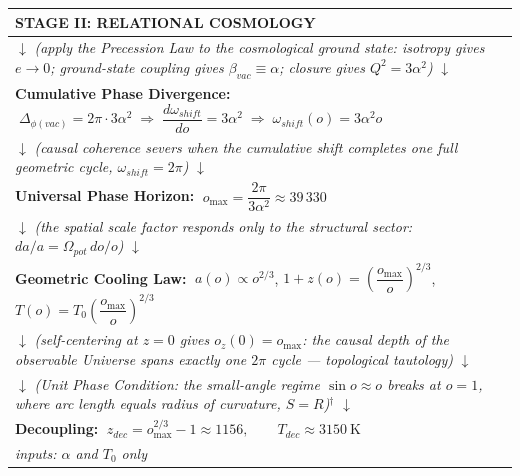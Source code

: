 \begin{tcolorbox}[colback=gray!5, colframe=black!80!black,
                  title=Derivation Chain Map --- WILL RG II (B): Stage II and Closure]
\begin{center}
\renewcommand{\arraystretch}{1.3}
\begin{tabular}{|>{\centering\arraybackslash}p{}|}
\hline

\textbf{\large STAGE II: RELATIONAL COSMOLOGY}\\\hline
$\downarrow$ \textit{(apply the Precession Law to the cosmological ground state: isotropy gives $e\to0$; ground-state coupling gives $\beta_{vac}\equiv\alpha$; closure gives $Q^{2}=3\alpha^{2}$)} $\downarrow$\\\hline
\textbf{Cumulative Phase Divergence:} $\;\Delta_{\phi(vac)}=2\pi\cdot3\alpha^{2}\;\Longrightarrow\;
\dfrac{d\omega_{shift}}{do}=3\alpha^{2}\;\Longrightarrow\;\boxed{\omega_{shift}(o)=3\alpha^{2}o}$\\[8pt]\hline
$\downarrow$ \textit{(causal coherence severs when the cumulative shift completes one full geometric cycle, $\omega_{shift}=2\pi$)} $\downarrow$\\\hline
\textbf{Universal Phase Horizon:} $\;\boxed{o_{\max}=\dfrac{2\pi}{3\alpha^{2}}\approx 39\,330}$\\[6pt]\hline
$\downarrow$ \textit{(the spatial scale factor responds only to the structural sector: $da/a=\Omega_{pot}\,do/o$)} $\downarrow$\\\hline
\textbf{Geometric Cooling Law:} $\;a(o)\propto o^{2/3}$, \quad
$1+z(o)=\left(\dfrac{o_{\max}}{o}\right)^{2/3}$, \quad
$T(o)=T_{0}\left(\dfrac{o_{\max}}{o}\right)^{2/3}$\\[8pt]\hline
$\downarrow$ \textit{(self-centering at $z=0$ gives $o_{z}(0)=o_{\max}$: the causal depth of the observable Universe spans exactly one $2\pi$ cycle --- topological tautology)} $\downarrow$\\\hline
$\downarrow$ \textit{(Unit Phase Condition: the small-angle regime $\sin o\approx o$ breaks at $o=1$, where arc length equals radius of curvature, $S=R$)}$^{\dagger}$ $\downarrow$\\\hline
\textbf{Decoupling:} $\;\boxed{z_{dec}=o_{\max}^{2/3}-1\approx 1156,\qquad T_{dec}\approx 3150\ \mathrm{K}}$\\
\textit{inputs: $\alpha$ and $T_{0}$ only}\\[6pt]\hline

\end{tabular}
\end{center}
\end{tcolorbox}
